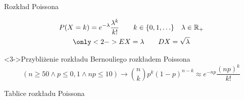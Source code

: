 \documentclass{mp}
\begin{document}
\begin{frame}{Rozkład Poissona}
\begin{gather*}
P(X=k)=e^{-\lambda}\frac{\lambda^k}{k!} \qquad k\in\{0,1,\ldots\}\quad \lambda\in\mathbb{R}_{+} \\
\only<2->{EX=\lambda\qquad DX=\sqrt{\lambda}}
\end{gather*}
\begin{block}<3->{Przybliżenie rozkładu Bernouliego rozkładem Poissona}
\[ \left( n\geq 50 \land p\leq 0{,}1 \land np\leq 10 \right) \to {n \choose k}p^k(1-p)^{n-k}\approx e^{-np}\frac{(np)^k}{k!} \]
\end{block}
\end{frame}
\begin{frame}{Tablice rozkładu Poissona}
\small
\tabcolsep=0.1cm

\end{frame}
\end{document}
